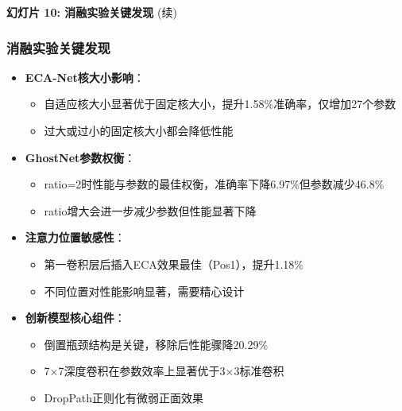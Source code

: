 \documentclass[10pt]{beamer}
\begin{document}
\begin{frame}{\textbf{幻灯片 10: 消融实验关键发现} (续)}
\frametitle{消融实验关键发现}

\begin{itemize}
    \item \textbf{ECA-Net核大小影响}：
    \begin{itemize}
        \item 自适应核大小显著优于固定核大小，提升1.58\%准确率，仅增加27个参数
        \item 过大或过小的固定核大小都会降低性能
    \end{itemize}
    
    \item \textbf{GhostNet参数权衡}：
    \begin{itemize}
        \item ratio=2时性能与参数的最佳权衡，准确率下降6.97\%但参数减少46.8\%
        \item ratio增大会进一步减少参数但性能显著下降
    \end{itemize}
    
    \item \textbf{注意力位置敏感性}：
    \begin{itemize}
        \item 第一卷积层后插入ECA效果最佳（Pos1），提升1.18\%
        \item 不同位置对性能影响显著，需要精心设计
    \end{itemize}
    
    \item \textbf{创新模型核心组件}：
    \begin{itemize}
        \item 倒置瓶颈结构是关键，移除后性能骤降20.29\%
        \item 7×7深度卷积在参数效率上显著优于3×3标准卷积
        \item DropPath正则化有微弱正面效果
    \end{itemize}
\end{itemize}

\end{frame}
\end{document}
